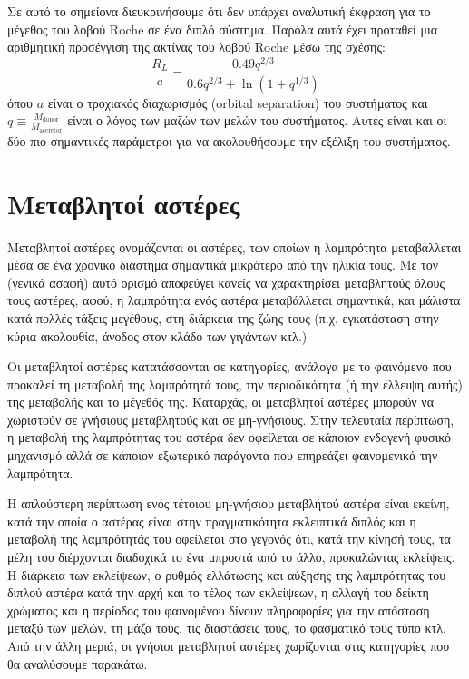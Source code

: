 Σε αυτό το σημείονα διευκρινήσουμε ότι δεν υπάρχει αναλυτική έκφραση για το μέγεθος του λοβού Roche σε ένα διπλό σύστημα. Παρόλα αυτά έχει προταθεί μια αριθμητική προσέγγιση της ακτίνας του λοβού Roche μέσω της σχέσης:
$$\frac{R_L}{a} = \frac{0.49q^{2/3}}{0.6q^{2/3} + \ln (1 + q^{1/3})}$$
όπου $a$ είναι ο τροχιακός διαχωρισμός (orbital separation) του συστήματος και $\displaystyle q \equiv \frac{M_{\text{donor}}}{M_{\text{accretor}}}$ είναι ο λόγος των μαζών των μελών του συστήματος.
Αυτές είναι και οι δύο πιο σημαντικές παράμετροι για να ακολουθήσουμε την εξέλιξη του συστήματος.













\section{Μεταβλητοί αστέρες}
Μεταβλητοί αστέρες ονομάζονται οι αστέρες, των οποίων η λαμπρότητα μεταβάλλεται μέσα σε ένα χρονικό διάστημα σημαντικά μικρότερο από την ηλικία τους. Με τον (γενικά ασαφή) αυτό ορισμό αποφεύγει κανείς να χαρακτηρίσει μεταβλητούς όλους τους αστέρες, αφού, η λαμπρότητα ενός αστέρα μεταβάλλεται σημαντικά, και μάλιστα κατά πολλές τάξεις μεγέθους, στη διάρκεια της ζώης τους (π.χ. εγκατάσταση στην κύρια ακολουθία, άνοδος στον κλάδο των γιγάντων κτλ.)

Οι μεταβλητοί αστέρες κατατάσσονται σε κατηγορίες, ανάλογα με το φαινόμενο που προκαλεί τη μεταβολή της λαμπρότητά τους, την περιοδικότητα (ή την έλλειψη αυτής) της μεταβολής και το μέγεθός της. Καταρχάς, οι μεταβλητοί αστέρες μπορούν να χωριστούν σε γνήσιους μεταβλητούς και σε μη-γνήσιους. Στην τελευταία περίπτωση, η μεταβολή της λαμπρότητας του αστέρα δεν οφείλεται σε κάποιον ενδογενή φυσικό μηχανισμό αλλά σε κάποιον εξωτερικό παράγοντα που επηρεάζει φαινομενικά την λαμπρότητα. 

Η απλούστερη περίπτωση ενός τέτοιου μη-γνήσιου μεταβλήτού αστέρα είναι εκείνη, κατά την οποία ο αστέρας είναι στην πραγματικότητα εκλειπτικά διπλός και η μεταβολή της λαμπρότητάς του οφείλεται στο γεγονός ότι, κατά την κίνησή τους, τα μέλη του διέρχονται διαδοχικά το ένα μπροστά από το άλλο, προκαλώντας εκλείψεις. Η διάρκεια των εκλείψεων, ο ρυθμός ελλάτωσης και αύξησης της λαμπρότητας του διπλού αστέρα κατά την αρχή και το τέλος των εκλείψεων, η αλλαγή του δείκτη χρώματος και η περίοδος του φαινομένου δίνουν πληροφορίες για την απόσταση μεταξύ των μελών, τη μάζα τους, τις διαστάσεις τους, το φασματικό τους τύπο κτλ.
Από την άλλη μεριά, οι γνήσιοι μεταβλητοί αστέρες χωρίζονται στις κατηγορίες που θα αναλύσουμε παρακάτω.

